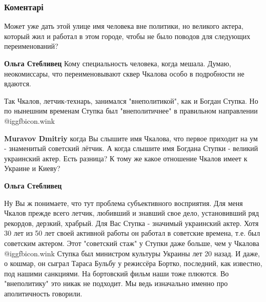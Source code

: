  
 
 
 
 
\subsubsection{Коментарі}

\begin{itemize} %

Может уже дать этой улице имя человека вне политики, но великого актера,
который жил и работал в этом городе, чтобы не было поводов для следующих
переименований?

\begin{itemize} %
\textbf{Ольга Стебливец} Кому специальность человека, когда мешала. Думаю, неокомиссары, что переименовывают сквер Чкалова особо в подробности не вдаются.


Так Чкалов, летчик-технарь, занимался "внеполитикой", как и Богдан Ступка. Но
по нынешним временам Ступка был "внеполитичнее" в правильном направлении  @igg{fbicon.wink} 

\begin{itemize} %
\textbf{Muravov Dmitriy} когда Вы слышите имя Чкалова, что первое приходит на ум - знаменитый советский лётчик.
А когда слышите имя Богдана Ступки - великий украинский актер. Есть разница?
К тому же какое отношение Чкалов имеет к Украине и Киеву?

\textbf{Ольга Стебливец} 

Ну Вы ж понимаете, что тут проблема субъективного восприятия. Для меня Чкалов
прежде всего летчик, любивший и знавший свое дело, установивший ряд рекордов,
дерзкий, храбрый. Для Вас Ступка - значимый украинский актер. Хотя 30 лет из 50
лет своей активной работы он работал в советские времена, т.е. был советским
актером. Этот "советский стаж" у Ступки даже больше, чем у Чкалова  @igg{fbicon.wink}  Ступка
был министром культуры Украины лет 20 назад. И даже, о кошмар, он сыграл Тараса
Бульбу у режиссёра Бортко, последний, как известно, под нашими санкциями. На
бортовский фильм наши тоже плюются. Во "внеполитику" это никак не подходит. Мы
ведь изначально именно про аполитичность говорили.


\end{itemize}
\end{itemize}
\end{itemize}
